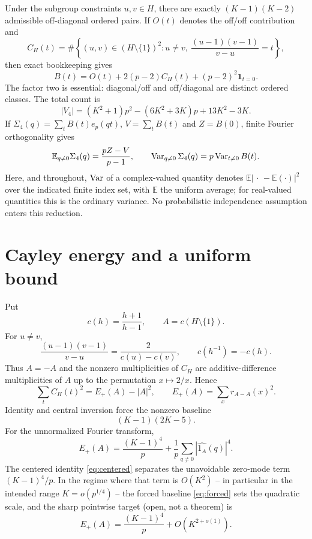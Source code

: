 Under the subgroup constraints $u,v\in H$, there are exactly
$(K-1)(K-2)$ admissible off-diagonal ordered pairs.  If $O(t)$ denotes the
off/off contribution and
\[
C_H(t)=\#\left\{(u,v)\in(H\setminus\{1\})^2:
 u\ne v,\ \frac{(u-1)(v-1)}{v-u}=t\right\},
\]
then exact bookkeeping gives
\begin{equation}\label{eq:Bdecomp}
B(t)=O(t)+2(p-2)C_H(t)+(p-2)^2\mathbf1_{t=0}.
\end{equation}
The factor two is essential: diagonal/off and off/diagonal are distinct ordered
classes.  The total count is
\begin{equation}\label{eq:V4}
|V_4|=(K^2+1)p^2-(6K^2+3K)p+13K^2-3K.
\end{equation}
If $\Sigma_4(q)=\sum_tB(t)e_p(qt)$, $V=\sum_tB(t)$ and $Z=B(0)$, finite
Fourier orthogonality gives
\begin{equation}\label{eq:meanvar}
\mathbb E_{q\ne0}\Sigma_4(q)=\frac{pZ-V}{p-1},
\qquad
\operatorname{Var}_{q\ne0}\Sigma_4(q)=p\operatorname{Var}_{t\ne0}B(t).
\end{equation}
Here, and throughout, $\operatorname{Var}$ of a complex-valued quantity denotes
$\mathbb E|\,\cdot\,-\mathbb E(\cdot)|^2$ over the indicated finite index
set, with $\mathbb E$ the uniform average; for real-valued quantities this is
the ordinary variance.
No probabilistic independence assumption enters this reduction.

\section{Cayley energy and a uniform bound}

Put
\[
c(h)=\frac{h+1}{h-1},\qquad A=c(H\setminus\{1\}).
\]
For $u\ne v$,
\begin{equation}\label{eq:cayley}
\frac{(u-1)(v-1)}{v-u}=\frac{2}{c(u)-c(v)},
\qquad c(h^{-1})=-c(h).
\end{equation}
Thus $A=-A$ and the nonzero multiplicities of $C_H$ are additive-difference
multiplicities of $A$ up to the permutation $x\mapsto2/x$.  Hence
\begin{equation}\label{eq:energyCH}
\sum_tC_H(t)^2=E_+(A)-|A|^2,
\qquad
E_+(A)=\sum_xr_{A-A}(x)^2.
\end{equation}
Identity and central inversion force the nonzero baseline
\begin{equation}\label{eq:forced}
(K-1)(2K-5).
\end{equation}
For the unnormalized Fourier transform,
\begin{equation}\label{eq:centered}
E_+(A)=\frac{(K-1)^4}{p}
 +\frac1p\sum_{q\ne0}|\widehat{1_A}(q)|^4.
\end{equation}
The centered identity \eqref{eq:centered} separates the unavoidable
zero-mode term $(K-1)^4/p$.  In the regime where that term is $O(K^2)$ -- in
particular in the intended range $K=o(p^{1/4})$ -- the forced baseline
\eqref{eq:forced} sets the quadratic scale, and the sharp pointwise target
(open, not a theorem) is
\begin{equation}\label{eq:sharp-target}
E_+(A)=\frac{(K-1)^4}{p}+O(K^{2+o(1)}).
\end{equation}

